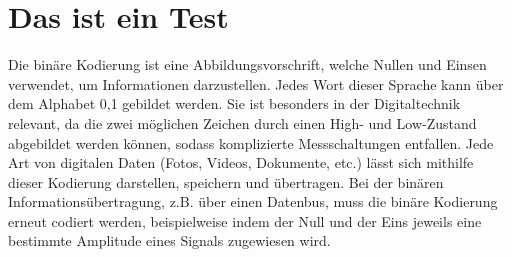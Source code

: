 \section{Das ist ein Test}
Die binäre Kodierung ist eine Abbildungsvorschrift, welche Nullen und Einsen verwendet,
um Informationen darzustellen. Jedes Wort dieser Sprache kann über dem Alphabet {0,1} gebildet werden.
Sie ist besonders in der Digitaltechnik relevant, da die zwei möglichen Zeichen durch
einen High- und Low-Zustand abgebildet werden können, sodass komplizierte Messschaltungen entfallen.
Jede Art von digitalen Daten (Fotos, Videos, Dokumente, etc.) lässt sich mithilfe dieser Kodierung
darstellen, speichern und übertragen.
Bei der binären Informationsübertragung, z.B. über einen Datenbus, muss die binäre Kodierung erneut
codiert werden, beispielweise indem der Null und der Eins jeweils eine bestimmte Amplitude eines 
Signals zugewiesen wird.